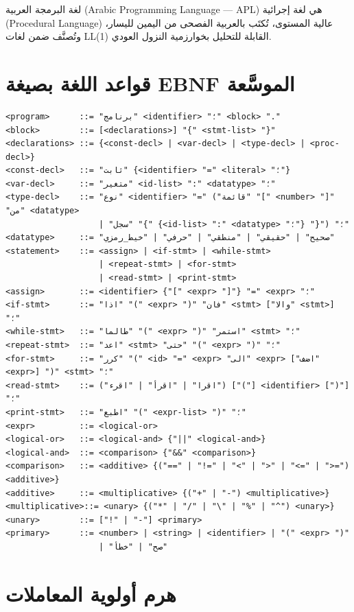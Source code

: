 \documentclass[12pt,a4paper]{report}
\begin{document}
لغة البرمجة العربية (Arabic Programming Language — APL) هي لغة إجرائية (Procedural Language) عالية المستوى، تُكتَب بالعربية الفصحى من اليمين لليسار، وتُصنَّف ضمن لغات LL(1) القابلة للتحليل بخوارزمية النزول العودي.

\section{قواعد اللغة بصيغة EBNF الموسَّعة}

\begin{CodeBox}[title={\small قواعد اللغة بصيغة EBNF (Extended Backus–Naur Form)}]
\begin{lstlisting}[basicstyle=\ttfamily\small]
<program>      ::= "برنامج" <identifier> "؛" <block> "."
<block>        ::= [<declarations>] "{" <stmt-list> "}"
<declarations> ::= {<const-decl> | <var-decl> | <type-decl> | <proc-decl>}
<const-decl>   ::= "ثابت" {<identifier> "=" <literal> "؛"}
<var-decl>     ::= "متغير" <id-list> ":" <datatype> "؛"
<type-decl>    ::= "نوع" <identifier> "=" ("قائمة" "[" <number> "]" "من" <datatype>
                   | "سجل" "{" {<id-list> ":" <datatype> "؛"} "}") "؛"
<datatype>     ::= "صحيح" | "حقيقي" | "منطقي" | "حرفي" | "خيط_رمزي"
<statement>    ::= <assign> | <if-stmt> | <while-stmt>
                   | <repeat-stmt> | <for-stmt>
                   | <read-stmt> | <print-stmt>
<assign>       ::= <identifier> {"[" <expr> "]"} "=" <expr> "؛"
<if-stmt>      ::= "اذا" "(" <expr> ")" "فان" <stmt> ["والا" <stmt>] "؛"
<while-stmt>   ::= "طالما" "(" <expr> ")" "استمر" <stmt> "؛"
<repeat-stmt>  ::= "اعد" <stmt> "حتى" "(" <expr> ")" "؛"
<for-stmt>     ::= "كرر" "(" <id> "=" <expr> "الى" <expr> ["اضف" <expr>] ")" <stmt> "؛"
<read-stmt>    ::= ("اقرا" | "اقرأ" | "اقرء") ["("] <identifier> [")"] "؛"
<print-stmt>   ::= "اطبع" "(" <expr-list> ")" "؛"
<expr>         ::= <logical-or>
<logical-or>   ::= <logical-and> {"||" <logical-and>}
<logical-and>  ::= <comparison> {"&&" <comparison>}
<comparison>   ::= <additive> {("==" | "!=" | "<" | ">" | "<=" | ">=") <additive>}
<additive>     ::= <multiplicative> {("+" | "-") <multiplicative>}
<multiplicative>::= <unary> {("*" | "/" | "\" | "%" | "^") <unary>}
<unary>        ::= ["!" | "-"] <primary>
<primary>      ::= <number> | <string> | <identifier> | "(" <expr> ")"
                   | "صح" | "خطأ"
\end{lstlisting}
\end{CodeBox}

\section{هرم أولوية المعاملات}
\end{document}
